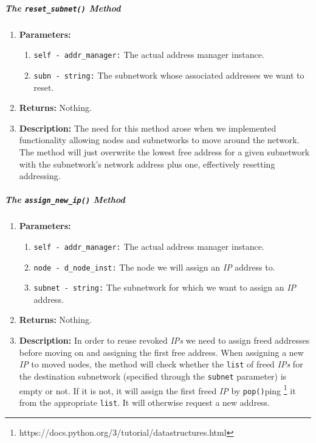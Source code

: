         \subparagraph{The \texttt{reset\_subnet()} Method}
            \begin{enumerate}
                \item \textbf{Parameters:}
                \begin{enumerate}
                    \item \texttt{self - addr\_manager:} The actual address manager instance.
                    \item \texttt{subn - string:} The subnetwork whose associated addresses we want to reset.
                \end{enumerate}
                \item \textbf{Returns:} Nothing.
                \item \textbf{Description:} The need for this method arose when we implemented functionality allowing nodes and subnetworks to move around the network. The method will just overwrite the lowest free address for a given subnetwork with the subnetwork's network address plus one, effectively resetting addressing.
            \end{enumerate}

        \subparagraph{The \texttt{assign\_new\_ip()} Method}
            \begin{enumerate}
                \item \textbf{Parameters:}
                \begin{enumerate}
                    \item \texttt{self - addr\_manager:} The actual address manager instance.
                    \item \texttt{node - d\_node\_inst:} The node we will assign an \textit{IP} address to.
                    \item \texttt{subnet - string:} The subnetwork for which we want to assign an \textit{IP} address.
                \end{enumerate}
                \item \textbf{Returns:} Nothing.
                \item \textbf{Description:} In order to reuse revoked \textit{IPs} we need to assign freed addresses before moving on and assigning the first free address. When assigning a new \textit{IP} to moved nodes, the method will check whether the \texttt{list} of freed \textit{IPs} for the destination subnetwork (specified through the \texttt{subnet} parameter) is empty or not. If it is not, it will assign the first freed \textit{IP} by \texttt{pop()}ping \footnote{https://docs.python.org/3/tutorial/datastructures.html} it from the appropriate \texttt{list}. It will otherwise request a new address.
            \end{enumerate}
